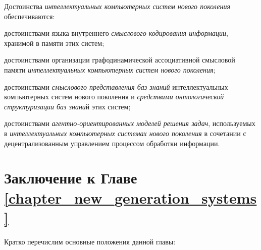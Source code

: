 Достоинства \textit{интеллектуальных компьютерных систем нового поколения} обеспечиваются:

\begin{textitemize}
	\item
	достоинствами языка внутреннего \textit{смыслового кодирования информации}, хранимой в памяти этих систем;
	\item
	достоинствами организации графодинамической ассоциативной смысловой памяти \textit{интеллектуальных компьютерных систем нового поколения};
	\item
	достоинствами \textit{смыслового представления баз знаний} интеллектуальных компьютерных систем нового поколения и \textit{средствами онтологической структуризации баз знани}й этих систем;
	\item
	достоинствами \textit{агентно-ориентированных моделей решения задач}, используемых в \textit{интеллектуальных компьютерных системах нового поколения} в сочетании с децентрализованным управлением процессом обработки информации.
\end{textitemize}

\section*{Заключение к Главе \ref{chapter_new_generation_systems}}
Кратко перечислим основные положения данной главы:

